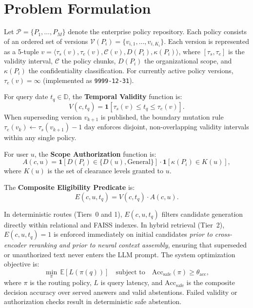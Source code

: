 \documentclass[journal]{IEEEtran}
\newcommand{\D}{\mathbb{D}}
\begin{document}
\section{Problem Formulation}

Let $\mathcal{P}=\{P_1,\ldots,P_M\}$ denote the enterprise policy repository. Each policy consists of an ordered set of versions $\mathcal{V}(P_i)=\{v_{i,1},\ldots,v_{i,K_i}\}$. Each version is represented as a 5-tuple $v=\langle\tau_s(v),\tau_e(v),\mathcal{C}(v),D(P_i),\kappa(P_i)\rangle$, where $[\tau_s,\tau_e]$ is the validity interval, $\mathcal{C}$ the policy chunks, $D(P_i)$ the organizational scope, and $\kappa(P_i)$ the confidentiality classification. For currently active policy versions, $\tau_e(v)=\infty$ (implemented as \texttt{9999-12-31}).

For query date $t_q\in\D$, the \textbf{Temporal Validity} function is:
\begin{equation}
  V(c,t_q)=\mathbf{1}[\tau_s(v)\le t_q\le\tau_e(v)].
  \label{eq:temporal}
\end{equation}
When superseding version $v_{k+1}$ is published, the boundary mutation rule $\tau_e(v_k)\leftarrow\tau_s(v_{k+1})-1\text{ day}$ enforces disjoint, non-overlapping validity intervals within any single policy.

For user $u$, the \textbf{Scope Authorization} function is:
\begin{equation}
  A(c,u)=\mathbf{1}[D(P_i)\in\{D(u),\text{General}\}]\cdot\mathbf{1}[\kappa(P_i)\in K(u)],
  \label{eq:auth}
\end{equation}
where $K(u)$ is the set of clearance levels granted to $u$.

The \textbf{Composite Eligibility Predicate} is:
\begin{equation}
  E(c,u,t_q)=V(c,t_q)\cdot A(c,u).
  \label{eq:eligibility}
\end{equation}

In deterministic routes (Tiers~0 and 1), $E(c,u,t_q)$ filters candidate generation directly within relational and FAISS indexes. In hybrid retrieval (Tier~2), $E(c,u,t_q)=1$ is enforced immediately on initial candidates \emph{prior to cross-encoder reranking and prior to neural context assembly}, ensuring that superseded or unauthorized text never enters the LLM prompt. The system optimization objective is:
\begin{equation}
  \min_\pi\,\mathbb{E}[L(\pi(q))]\quad\text{subject to}\quad
  \text{Acc}_{\text{safe}}(\pi)\ge\theta_{\text{acc}},
  \label{eq:objective}
\end{equation}
where $\pi$ is the routing policy, $L$ is query latency, and $\text{Acc}_{\text{safe}}$ is the composite decision accuracy over served answers and valid abstentions. Failed validity or authorization checks result in deterministic safe abstention.
\end{document}
